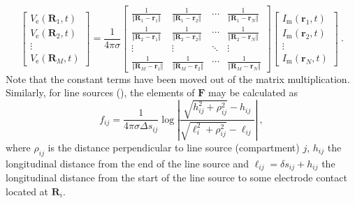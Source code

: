 \begin{equation}
\begin{bmatrix}
V_\text{e}(\mathbf{R}_1, t) \\
V_\text{e}(\mathbf{R}_2, t) \\
\vdots \\
V_\text{e}(\mathbf{R}_M, t)
\end{bmatrix}
= \frac{1}{4\pi\sigma}
\begin{bmatrix}
\frac{1}{\Vert\mathbf{R}_1 - \mathbf{r}_1\Vert} & \frac{1}{\Vert\mathbf{R}_1 - \mathbf{r}_2\Vert} & \cdots & \frac{1}{\Vert\mathbf{R}_1 - \mathbf{r}_N\Vert} \\
\frac{1}{\Vert\mathbf{R}_2 - \mathbf{r}_1\Vert} & \frac{1}{\Vert\mathbf{R}_2 - \mathbf{r}_2\Vert} & \cdots & \frac{1}{\Vert\mathbf{R}_2 - \mathbf{r}_N\Vert} \\
\vdots & \vdots & \ddots & \vdots \\
\frac{1}{\Vert\mathbf{R}_M - \mathbf{r}_1\Vert} & \frac{1}{\Vert\mathbf{R}_M - \mathbf{r}_2\Vert} & \cdots & \frac{1}{\Vert\mathbf{R}_M - \mathbf{r}_N\Vert}
\end{bmatrix}
\begin{bmatrix}
I_\text{m}(\mathbf{r}_1, t) \\
I_\text{m}(\mathbf{r}_2, t) \\
\vdots \\
I_\text{m}(\mathbf{r}_N, t)
\end{bmatrix} ~.
\end{equation}
%
Note that the constant terms have been moved out of the matrix multiplication.
Similarly, for line sources (), the elements of $\mathbf{F}$ may be calculated as
%
\begin{equation}
f_{ij} = \frac{1}{4\pi \sigma \Delta s_{ij}} \log \left| \frac{\sqrt{h_{ij}^2+\rho_{ij}^2}-h_{ij}}{\sqrt{\ell_i^2+\rho_{ij}^2}-\ell_{ij}} \right| ~,
\label{eq:LFPy:linesources}
\end{equation}
%
where $\rho_{ij}$ is the distance perpendicular to line source (compartment) $j$,
$h_{ij}$ the longitudinal distance from the end of the line source
and $\ell_{ij} = \delta s_{ij} + h_{ij}$ the longitudinal distance from the start of the line source to some electrode contact located at $\mathbf{R}_i$.

